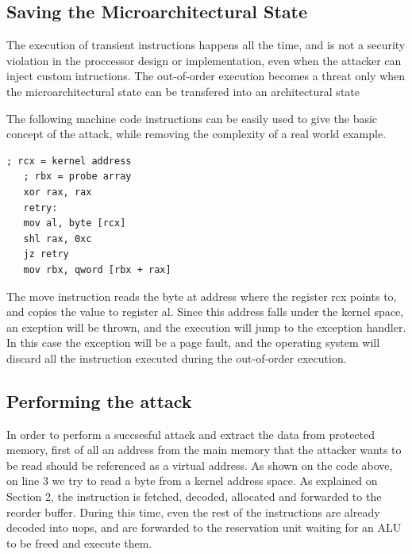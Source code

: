 \documentclass[sigconf]{acmart}
\begin{document}
\subsection{Saving the Microarchitectural State}

The execution of transient instructions happens all the time, and is not a security violation in the proccessor design or implementation, even when the attacker can inject custom intructions. 
The out-of-order execution becomes a threat only when the microarchitectural state can be transfered into an architectural state

The following machine code instructions can be easily used to give the basic concept of the attack, while removing the complexity of a real world example. 
\begin{lstlisting}[caption = Some random text caption goes here]
   ; rcx = kernel address
   ; rbx = probe array
   xor rax, rax
   retry:
   mov al, byte [rcx]
   shl rax, 0xc
   jz retry
   mov rbx, qword [rbx + rax]
\end{lstlisting}

The move instruction reads the byte at address where the register rcx points to, and copies the value to register al. Since this address falls under the kernel space, an exeption will be thrown, and the execution will jump to the exception handler. In this case the exception will be a page fault, and the operating system will discard all the instruction executed during the out-of-order execution. 

\subsection{Performing the attack}

In order to perform a succsesful attack and extract the data from protected memory, first of all an address from the main memory that the attacker wants to be read should be referenced as a virtual address. As shown on the code above, on line 3 we try to read a byte from a kernel address space. As explained on Section 2, the instruction is fetched, decoded, allocated and forwarded to the reorder buffer. During this time, even the rest of the instructions are already decoded into uops, and are forwarded to the reservation unit waiting for an ALU to be freed and execute them. 
\end{document}
